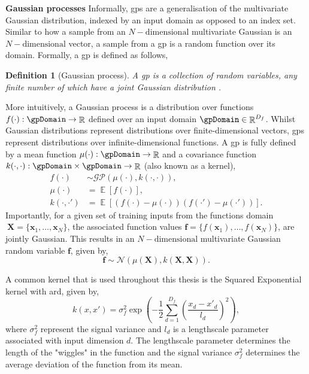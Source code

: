 \documentclass{mimosis-class/mimosis}
\newtheorem{definition}{Definition}[section]
\numberwithin{equation}{chapter}
\DeclareMathOperator{\R}{\mathbb{R}}
\DeclareMathOperator{\E}{\mathbb{E}}
\begin{document}
\textbf{Gaussian processes}
Informally, \acrshort{gps} are a generalisation of the multivariate Gaussian distribution, indexed by an
input domain as opposed to an index set.
Similar to how a sample from an \(N-\text{dimensional}\) multivariate Gaussian is an \(N-\text{dimensional}\) vector,
a sample from a \acrshort{gp} is a random function over its domain.
Formally, a \acrshort{gp} is defined as follows,
\begin{definition}[Gaussian process]
A \acrfull{gp} is a collection of random variables, any finite number of which
have a joint Gaussian distribution \citep{rasmussenGaussian2006}.
\end{definition}

More intuitively, a Gaussian process  is a distribution over functions \(f(\cdot): \gpDomain \rightarrow \R\)
defined over an input domain \(\gpDomain \in \R^{D_f}\).
Whilst Gaussian distributions represent distributions over finite-dimensional vectors, \acrshort{gps} represent
distributions over infinite-dimensional functions.
A \acrshort{gp} is fully defined by a mean function \(\mu(\cdot) : \gpDomain \rightarrow \R\) and a covariance
function \(k(\cdot, \cdot) : \gpDomain \times \gpDomain \rightarrow \R\) (also known as a kernel),
\begin{align} \label{eq-gp-mean-cov}
f(\cdot) &\sim \mathcal{GP}\left(\mu(\cdot), k(\cdot,\cdot) \right), \\
\mu(\cdot) &= \E[f(\cdot)], \\
k(\cdot, \cdot') &= \E[(f(\cdot) -\mu(\cdot)) (f(\cdot') - \mu(\cdot'))].
\end{align}
Importantly, for a given set of training inputs from the
functions domain \(~{\mathbf{X} = \{ \mathbf{x}_1, \ldots, \mathbf{x}_N \}}\), the associated function values
\(\mathbf{f} = \{f(\mathbf{x}_1), \ldots, f(\mathbf{x}_N) \}\),
are jointly Gaussian.
This results in an \(N-\text{dimensional}\) multivariate Gaussian random variable \(\mathbf{f}\), given by,
\begin{equation} \label{eq-gp-marginal}
\mathbf{f} \sim \mathcal{N}(\mu(\mathbf{X}), k(\mathbf{X}, \mathbf{X})).
\end{equation}
\begin{myquote}
A common kernel that is used throughout this thesis is the Squared Exponential
kernel with \acrfull{ard}, given by,
\begin{equation} \label{eq-se-kernel}
k(x, x') = \sigma_f^2 \exp\left(-\frac{1}{2} \sum_{d=1}^{D_f} \left( \frac{x_{d}- x'_{d}}{l_d} \right)^2 \right),
\end{equation}
where $\sigma_f^2$ represent the signal variance and $l_d$ is a lengthscale parameter associated with
input dimension $d$.
The lengthscale parameter determines the length of the "wiggles" in the function and
the signal variance $\sigma_f^2$ determines the average deviation of the function from its mean.
\end{myquote}
\end{document}
